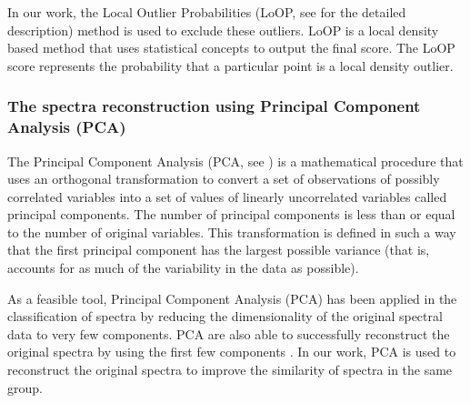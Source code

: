 \documentclass[manuscript]{aastex}
\begin{document}
In our work, the Local Outlier Probabilities (LoOP, see \cite{kriegel2009loop} for the detailed description) method is used to exclude these outliers.
LoOP is a local density based method that uses statistical concepts to output the final score.
The LoOP score represents the probability that a particular point is a local density outlier.


\subsubsection{The spectra reconstruction using Principal Component Analysis (PCA)}
The Principal Component Analysis  (PCA, see \cite{jolliffe2002principal}) is a mathematical procedure that uses an orthogonal transformation to convert a set of observations of possibly correlated variables into a set of values of linearly uncorrelated variables called principal components.
The number of principal components is less than or equal to the number of original variables.
This transformation is defined in such a way that the first principal component has the largest possible variance  (that is,  accounts for as much of the variability in the data as possible).

As a feasible tool, Principal Component Analysis (PCA) has been applied  in the classification of spectra \citep{whitney1983principal,bailer1998automated,yip2004spectral,almeida2013automated} by  reducing the dimensionality of the original spectral data to very few components.
PCA are also able to successfully reconstruct the original spectra by using the first few components \citep{singh1998stellar}.
In our work, PCA is used to reconstruct the original spectra to improve the similarity of spectra in the same group.
				
\end{document}
